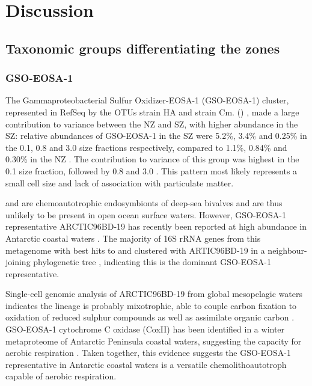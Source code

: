 


\section{Discussion}

\subsection{Taxonomic groups differentiating the zones}

\subsubsection{GSO-EOSA-1}

The Gammaproteobacterial Sulfur Oxidizer-EOSA-1 (GSO-EOSA-1) cluster, represented in RefSeq by the \acp{OTU}  strain HA and  strain Cm. () \cite{Walsh:2009fja}, made a large contribution to variance between the \ac{NZ} and \ac{SZ}, with higher abundance in the \ac{SZ}: relative abundances of GSO-EOSA-1 in the \ac{SZ} were 5.2\%, 3.4\% and 0.25\% in the 0.1, 0.8 and 3.0 \micron{} size fractions respectively, compared to 1.1\%, 0.84\% and 0.30\% in the \ac{NZ} .
The contribution to variance of this group was highest in the 0.1 \micron{} size fraction, followed by 0.8 \micron{} and 3.0 \micron{} .
This pattern most likely represents a small cell size and lack of association with particulate matter.

 and  are chemoautotrophic endosymbionts of deep-sea bivalves \cite{Kuwahara:2007gf,Newton:2007fu} and are thus unlikely to be present in open ocean surface waters. 
However, GSO-EOSA-1 representative ARCTIC96BD-19 has recently been reported at high abundance in Antarctic coastal waters \cite{Ghiglione:2011ee,Grzymski:2012ej}.
The majority of 16S rRNA genes from this metagenome with best  hits to  and  clustered with ARTIC96BD-19 in a neighbour-joining phylogenetic tree , indicating this is the dominant GSO-EOSA-1 representative. 


Single-cell genomic analysis of ARCTIC96BD-19 from global mesopelagic waters indicates the lineage is probably mixotrophic, able to couple carbon fixation to oxidation of reduced sulphur compounds as well as assimilate organic carbon \cite{Swan:2011hb}.
GSO-EOSA-1 cytochrome C oxidase (CoxII) has been identified in a winter metaproteome of Antarctic Peninsula coastal waters, suggesting the capacity for aerobic respiration \cite{Williams:2012bs}.
Taken together, this evidence suggests the GSO-EOSA-1 representative in Antarctic coastal waters is a versatile chemolithoautotroph capable of aerobic respiration.

